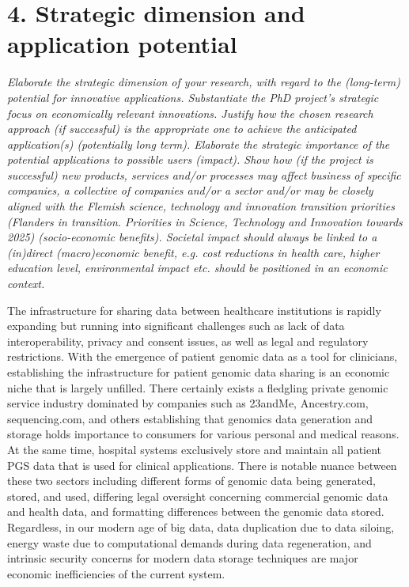 \documentclass{article}
\begin{document}
\section{4. Strategic dimension and application potential}
\textit{Elaborate the strategic dimension of your research, with regard to the (long-term) potential for innovative applications. 
Substantiate the PhD project’s strategic focus on economically relevant innovations. Justify how the chosen research approach (if successful) is the appropriate one to achieve the anticipated application(s) (potentially long term).
Elaborate the strategic importance of the potential applications to possible users (impact). Show how (if the project is successful) new products, services and/or processes may affect business of specific companies, a collective of companies and/or a sector and/or may be closely aligned with the Flemish science, technology and innovation transition priorities  (Flanders in transition. Priorities in Science, Technology and Innovation towards 2025) (socio-economic benefits). Societal impact should always be linked to a (in)direct (macro)economic benefit, e.g. cost reductions in health care, higher education level, environmental impact etc. should be positioned in an economic context.}

The infrastructure for sharing data between healthcare institutions is rapidly expanding but running into significant challenges such as lack of data interoperability, privacy and consent issues, as well as legal and regulatory restrictions. With the emergence of patient genomic data as a tool for clinicians, establishing the infrastructure for patient genomic data sharing is an economic niche that is largely unfilled. There certainly exists a fledgling private genomic service industry dominated by companies such as 23andMe, Ancestry.com, sequencing.com, and others establishing that genomics data generation and storage holds importance to consumers for various personal and medical reasons. At the same time, hospital systems exclusively store and maintain all patient PGS data that is used for clinical applications. There is notable nuance between these two sectors including different forms of genomic data being generated, stored, and used, differing legal oversight concerning commercial genomic data and health data, and formatting differences between the genomic data stored. Regardless, in our modern age of big data, data duplication due to data siloing, energy waste due to computational demands during data regeneration, and intrinsic security concerns for modern data storage techniques are major economic inefficiencies of the current system. 
\end{document}
